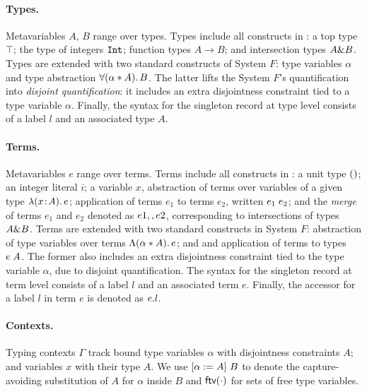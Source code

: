 \paragraph{Types.} 
Metavariables $A$, $B$ range over types. 
Types include all constructs in \oldname: a top type $\top$; 
the type of integers $\texttt{Int}$;
function types $A \to B$; and intersection types $A \& B$.
Types are extended with two standard constructs of System $F$: 
type variables $\alpha$ and type abstraction $\forall (\alpha * A).\, B$. 
The latter lifts the System $F$'s quantification into \emph{disjoint quantification}:
it includes an extra disjointness constraint tied to a type variable $\alpha$.
Finally, the syntax for the singleton record at type level consists of a label $l$ and
an associated type $A$.

\paragraph{Terms.} 
Metavariables $e$ range over terms.  
Terms include all constructs in \oldname: a unit type $()$; an integer literal $i$;
a variable $x$, abstraction of terms over variables of
a given type $\lambda (x \!:\! A).\, e$; application of terms $e_1$ to terms $e_2$, written
$e_1 \; e_2$; and the \emph{merge} of terms $e_1$ and $e_2 $ denoted as 
$e1 ,, e2$, corresponding to intersections of types $A \& B$.
Terms are extended with two standard constructs in System $F$:
abstraction of type variables over terms $\Lambda (\alpha * A).\, e$; and
and application of terms to types $e \; A$. 
The former also includes an extra disjointness constraint tied to the type 
variable $\alpha$, due to disjoint quantification.
The syntax for the singleton record at term level consists of a label $l$ and
an associated term $e$.
Finally, the accessor for a label $l$ in term $e$ is denoted as $e . l$.

\paragraph{Contexts.} Typing contexts $ \Gamma $ track bound type variables
$\alpha$ with disjointness constraints $A$; and variables $x$ with their type $A$. 
We use $\lbrack \alpha := A \rbrack~ {B}$
to denote the capture-avoiding substitution of $A$ for $\alpha$ inside $B$ and
$\textsf{ftv}(\cdot)$ for sets of free type variables. %

